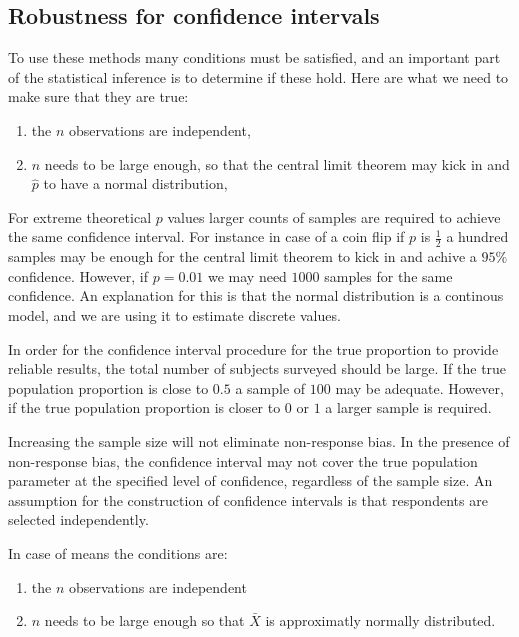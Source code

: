 \subsection{Robustness for confidence intervals}

To use these methods many conditions must be satisfied, and an important part of
the statistical inference is to determine if these hold. Here are what we need
to make sure that they are true:

\begin{enumerate}
  \item the $n$ observations are independent,
  \item $n$ needs to be large enough, so that the central limit theorem may kick
  in and $\hat{p}$ to have a normal distribution, 
\end{enumerate}

For extreme theoretical $p$ values larger counts of samples are required to
achieve the same confidence interval. For instance in case of a coin flip if $p$
is $\frac{1}{2}$ a hundred samples may be enough for the central limit theorem
to kick in and achive a $95\%$ confidence. However, if $p=0.01$ we may need
$1000$ samples for the same confidence. An explanation for this is that the
normal distribution is a continous model, and we are using it to estimate 
discrete values.

In order for the confidence interval procedure for the true proportion to
provide reliable results, the total number of subjects surveyed should be large.
If the true population proportion is close to $0.5$ a sample of $100$ may be
adequate. However, if the true population proportion is closer to $0$ or $1$ a
larger sample is required.

Increasing the sample size will not eliminate non-response bias. In the presence
of non-response bias, the confidence interval may not cover the true population
parameter at the specified level of confidence, regardless of the sample size.
An assumption for the construction of confidence intervals is that respondents
are selected independently.

In case of means the conditions are:

\begin{enumerate}
  \item the $n$ observations are independent
  \item $n$ needs to be large enough so that $\bar{X}$ is approximatly normally
  distributed.
\end{enumerate}

